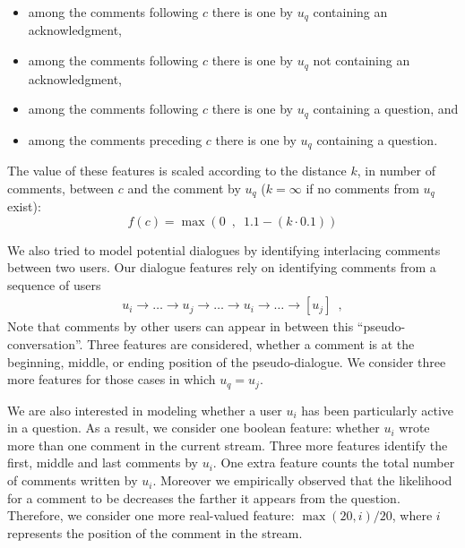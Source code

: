 \begin{itemize}\setlength\itemsep{-0.4em}
\item among the comments following $c$ there is one by $u_q$ containing 
an acknowledgment,
\item among the comments following $c$ there is one by $u_q$ not 
containing an acknowledgment,
\item among the comments following $c$ there is one by $u_q$ containing a 
question, and
\item among the comments preceding $c$ there is one by $u_q$ containing a 
question.
\end{itemize}

The value of these features is scaled according to the distance $k$, in number 
of comments, between $c$ and the comment by $u_q$ ($k=\infty$ if no 
comments from $u_q$ exist):
% 
\begin{equation}
 f(c)=\max \left(0\enspace,\enspace 1.1-(k \cdot 0.1) \right)
\end{equation}
%

We also tried to model potential dialogues by identifying interlacing comments 
between two users. Our dialogue features rely on identifying comments from
a sequence of users 
\begin{align*}
u_i \rightarrow \ldots \rightarrow 
u_j \rightarrow \ldots \rightarrow
u_i \rightarrow \ldots \rightarrow
[u_j] \enspace ,
\end{align*}
% 
Note that comments by other 
users can appear in between this ``pseudo-conversation''. Three features are 
considered, whether a comment is at the beginning, middle, or ending position of 
the pseudo-dialogue. We consider three more features for those cases in which 
$u_q=u_j$. 

We are also interested in modeling whether a user $u_i$ has been particularly 
active in a question. As a result, we consider one boolean feature: whether 
$u_i$ wrote more than one comment in the current stream. Three more features 
identify the first, middle and last comments by $u_i$. One extra feature counts 
the total number of comments written by $u_i$. Moreover we empirically observed 
that the likelihood for a comment to be \good decreases the farther it appears 
from the question. Therefore, we consider one more real-valued feature: 
$\max(20, i)/20$, where $i$ represents the position of the comment in the 
stream.


